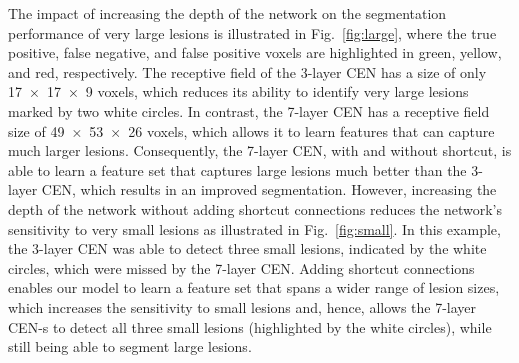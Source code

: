 The impact of increasing the depth of the network on the segmentation
performance of very large lesions is illustrated in Fig.~\ref{fig:large}, where
the true positive, false negative, and false positive voxels are highlighted in
green, yellow, and red, respectively. The receptive field of the 3-layer CEN has
a size of only \num{17x17x9} voxels, which reduces its ability to identify very
large lesions marked by two white circles. In contrast, the 7-layer CEN has a
receptive field size of \num{49x53x26} voxels, which allows it to learn features
that can capture much larger lesions. Consequently, the 7-layer CEN, with and
without shortcut, is able to learn a feature set that captures large lesions
much better than the 3-layer CEN, which results in an improved segmentation.
However, increasing the depth of the network without adding shortcut connections
reduces the network's sensitivity to very small lesions as illustrated in
Fig.~\ref{fig:small}. In this example, the 3-layer CEN was able to detect three
small lesions, indicated by the white circles, which were missed by the 7-layer
CEN. Adding shortcut connections enables our model to learn a feature set that
spans a wider range of lesion sizes, which increases the sensitivity to small
lesions and, hence, allows the 7-layer \mbox{CEN-s} to detect all three small
lesions (highlighted by the white circles), while still being able to segment
large lesions.

